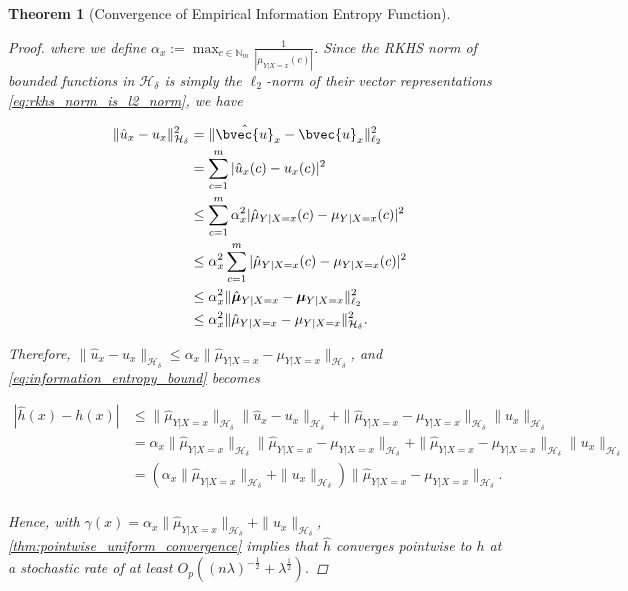 \documentclass{article}
\newtheorem{theorem}{Theorem}[section]
\begin{document}
\begin{theorem}[Convergence of Empirical Information Entropy Function]
\begin{proof}
			where we define $\alpha_{x} := \max_{c \in \mathbb{N}_{m}} \frac{1}{| \mu_{Y | X = x}(c) |}$. Since the RKHS norm of bounded functions in $\mathcal{H}_{\delta}$ is simply the $\ell_{2}$-norm of their vector representations \eqref{eq:rkhs_norm_is_l2_norm}, we have
			
			\begin{equation}
			\begin{aligned}
				\| \hat{u}_{x} - u_{x} \|_{\mathcal{H}_{\delta}}^{2} &= \| \hat{\bvec{u}}_{x} - \bvec{u}_{x} \|_{\ell_{2}}^{2} \\
				&= \sum_{c = 1}^{m} | \hat{u}_{x}(c) - u_{x}(c) |^{2} \\
				&\leq \sum_{c = 1}^{m} \alpha_{x}^{2} | \hat{\mu}_{Y | X = x}(c) - \mu_{Y | X = x}(c) |^{2} \\
				&\leq \alpha_{x}^{2} \sum_{c = 1}^{m} | \hat{\mu}_{Y | X = x}(c) - \mu_{Y | X = x}(c) |^{2} \\
				&\leq \alpha_{x}^{2} \| \hat{\bm{\mu}}_{Y | X = x} - \bm{\mu}_{Y | X = x}  \|_{\ell_{2}}^{2} \\
				&\leq \alpha_{x}^{2} \| \hat{\mu}_{Y | X = x} - \mu_{Y | X = x} \|_{\mathcal{H}_{\delta}}^{2}. \\
			\end{aligned}
			\end{equation}
			
			Therefore, $\| \hat{u}_{x} - u_{x} \|_{\mathcal{H}_{\delta}} \leq \alpha_{x} \| \hat{\mu}_{Y | X = x} - \mu_{Y | X = x} \|_{\mathcal{H}_{\delta}}$, and \eqref{eq:information_entropy_bound} becomes
			
			\begin{equation}
			\begin{aligned}
				| \hat{h}(x) - h(x) | &\leq \| \hat{\mu}_{Y | X = x} \|_{\mathcal{H}_{\delta}} \| \hat{u}_{x} - u_{x} \|_{\mathcal{H}_{\delta}} + \| \hat{\mu}_{Y | X = x} - \mu_{Y | X = x} \|_{\mathcal{H}_{\delta}} \| u_{x} \|_{\mathcal{H}_{\delta}} \\
				&= \alpha_{x} \| \hat{\mu}_{Y | X = x} \|_{\mathcal{H}_{\delta}} \| \hat{\mu}_{Y | X = x} - \mu_{Y | X = x} \|_{\mathcal{H}_{\delta}} + \| \hat{\mu}_{Y | X = x} - \mu_{Y | X = x} \|_{\mathcal{H}_{\delta}} \| u_{x} \|_{\mathcal{H}_{\delta}} \\
				&= ( \alpha_{x} \| \hat{\mu}_{Y | X = x} \|_{\mathcal{H}_{\delta}} + \| u_{x} \|_{\mathcal{H}_{\delta}} ) \| \hat{\mu}_{Y | X = x} - \mu_{Y | X = x} \|_{\mathcal{H}_{\delta}}. \\
			\end{aligned}
			\end{equation}
			
			Hence, with $\gamma(x) = \alpha_{x} \| \hat{\mu}_{Y | X = x} \|_{\mathcal{H}_{\delta}} + \| u_{x} \|_{\mathcal{H}_{\delta}}$, \cref{thm:pointwise_uniform_convergence} implies that $\hat{h}$ converges pointwise to $h$ at a stochastic rate of at least $O_{p}((n \lambda)^{-\frac{1}{2}} + \lambda^{\frac{1}{2}})$.
		\end{proof}
	\end{theorem}
	
\end{document}
